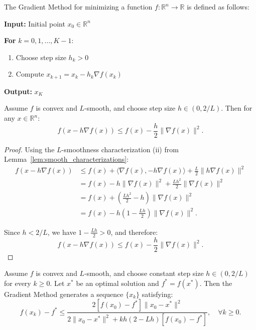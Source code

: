 \begin{definition}
  \label{def:gradient_method}
  \leanok
  The Gradient Method for minimizing a function $f: \mathbb{R}^n \to \mathbb{R}$ is defined as follows:
  
  \textbf{Input:} Initial point $x_0 \in \mathbb{R}^n$
  
  \textbf{For} $k = 0, 1, \ldots, K-1$:
  \begin{enumerate}
    \item Choose step size $h_k > 0$
    \item Compute $x_{k+1} = x_k - h_k \nabla f(x_k)$
  \end{enumerate}
  
  \textbf{Output:} $x_K$
\end{definition}

\begin{lemma}
  \label{lem:descent_property}
  \leanok
  Assume $f$ is convex and $L$-smooth, and choose step size $h \in (0, 2/L)$. Then for any $x \in \mathbb{R}^n$:
  \[
    f(x - h\nabla f(x)) \leq f(x) - \frac{h}{2}\|\nabla f(x)\|^2.
  \]
\end{lemma}

\begin{proof}
  Using the $L$-smoothness characterization (ii) from Lemma~\ref{lem:smooth_characterizations}:
  \begin{align}
    f(x - h\nabla f(x)) &\leq f(x) + \langle\nabla f(x), -h\nabla f(x)\rangle + \frac{L}{2}\|h\nabla f(x)\|^2 \\
    &= f(x) - h\|\nabla f(x)\|^2 + \frac{Lh^2}{2}\|\nabla f(x)\|^2 \\
    &= f(x) + \left(\frac{Lh^2}{2} - h\right)\|\nabla f(x)\|^2 \\
    &= f(x) - h\left(1 - \frac{Lh}{2}\right)\|\nabla f(x)\|^2.
  \end{align}
  
  Since $h < 2/L$, we have $1 - \frac{Lh}{2} > 0$, and therefore:
  \[
    f(x - h\nabla f(x)) \leq f(x) - \frac{h}{2}\|\nabla f(x)\|^2.
  \]
\end{proof}

\begin{theorem}
  \label{thm:gradient_convergence}
  \leanok
  Assume $f$ is convex and $L$-smooth, and choose constant step size $h \in (0, 2/L)$ for every $k \geq 0$. Let $x^*$ be an optimal solution and $f^* = f(x^*)$. Then the Gradient Method generates a sequence $\{x_k\}$ satisfying:
  \[
    f(x_k) - f^* \leq \frac{2[f(x_0) - f^*]\|x_0 - x^*\|^2}{2\|x_0 - x^*\|^2 + kh(2 - Lh)[f(x_0) - f^*]}, \quad \forall k \geq 0.
  \]
\end{theorem}

